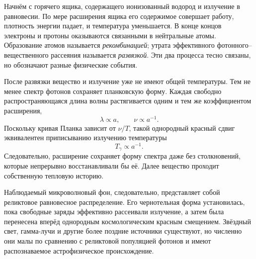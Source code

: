 Начнём с горячего ящика, содержащего ионизованный водород и излучение в равновесии. По мере расширения ящика его содержимое совершает работу, плотность энергии падает, и температура уменьшается. В конце концов электроны и протоны оказываются связанными в нейтральные атомы. Образование атомов называется \emph{рекомбинацией}; утрата эффективного фотонного--вещественного рассеяния называется \emph{развязкой}. Эти два процесса тесно связаны, но обозначают разные физические события.

После развязки вещество и излучение уже не имеют общей температуры. Тем не менее спектр фотонов сохраняет планковскую форму. Каждая свободно распространяющаяся длина волны растягивается одним и тем же коэффициентом расширения,
\begin{equation}
\lambda\propto a,
\qquad
\nu\propto a^{-1}.
\end{equation}
Поскольку кривая Планка зависит от \(\nu/T\), такой однородный красный сдвиг эквивалентен приписыванию излучению температуры
\begin{equation}
\boxed{T_\gamma\propto a^{-1}.}
\label{eq:c07-temperature-scaling}
\end{equation}
Следовательно, расширение сохраняет форму спектра даже без столкновений, которые непрерывно восстанавливали бы её. Далее вещество проходит собственную тепловую историю.

Наблюдаемый микроволновый фон, следовательно, представляет собой реликтовое равновесное распределение. Его чернотельная форма установилась, пока свободные заряды эффективно рассеивали излучение, а затем была перенесена вперёд однородным космологическим красным смещением. Звёздный свет, гамма-лучи и другие более поздние источники существуют, но численно они малы по сравнению с реликтовой популяцией фотонов и имеют распознаваемое астрофизическое происхождение.

\begin{classroomqa}
\end{classroomqa}

